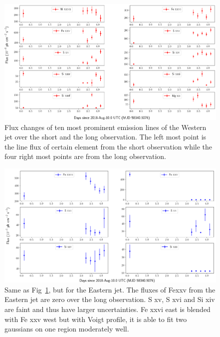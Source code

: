 \begin{figure}
    \centering
    \includegraphics[width = \linewidth]{Chapters/Figures/west_flux.png}
    \caption{Flux changes of ten most prominent emission lines of the Western jet over the short and the long observation. The left most point is the line flux of certain element from the short observation while the four right most points are from the long observation. }
    \label{west_flux}
\end{figure}




\begin{figure}
    \centering
    \includegraphics[width = \linewidth]{Chapters/Figures/east_flux.png}
    \caption{Same as Fig~\ref{west_flux}, but for the Eastern jet. The fluxes of Fe{\sc xxv} from the Eastern jet are zero over the long observation. S {\sc xv}, S {\sc xvi} and Si {\sc xiv} are faint and thus have larger uncertainties. Fe {\sc xxvi} east is blended with Fe {\sc xxv} west but with Voigt profile, it is able to fit two gaussians on one region moderately well.}
    \label{east_flux}
\end{figure}


